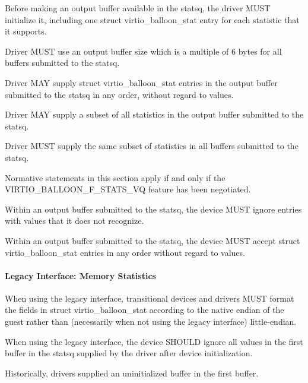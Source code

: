 Before making an output buffer available in the statsq, the
driver MUST initialize it, including one struct
virtio_balloon_stat entry for each statistic that it supports.

Driver MUST use an output buffer size which is a multiple of 6
bytes for all buffers submitted to the statsq.

Driver MAY supply struct virtio_balloon_stat entries in the
output buffer submitted to the statsq in any order, without
regard to  values.

Driver MAY supply a subset of all statistics in the output buffer
submitted to the statsq.

Driver MUST supply the same subset of statistics in all buffers
submitted to the statsq.

Normative statements in this section apply if and only if  the
VIRTIO_BALLOON_F_STATS_VQ feature has been negotiated.

Within an output buffer submitted to the statsq,
the device MUST ignore entries with  values that it does not recognize.

Within an output buffer submitted to the statsq,
the device MUST accept struct virtio_balloon_stat entries in any
order without regard to  values.

\paragraph{Legacy Interface: Memory Statistics}\label{sec:Device Types / Memory Balloon Device / Device Operation / Memory Statistics / Legacy Interface: Memory Statistics}

When using the legacy interface, transitional devices and drivers
MUST format the fields in struct virtio_balloon_stat
according to the native endian of the guest rather than
(necessarily when not using the legacy interface) little-endian.

When using the legacy interface,
the device SHOULD ignore all values in the first buffer in the
statsq supplied by the driver after device initialization.
\begin{note}
Historically, drivers supplied an uninitialized buffer in the
first buffer.
\end{note}

